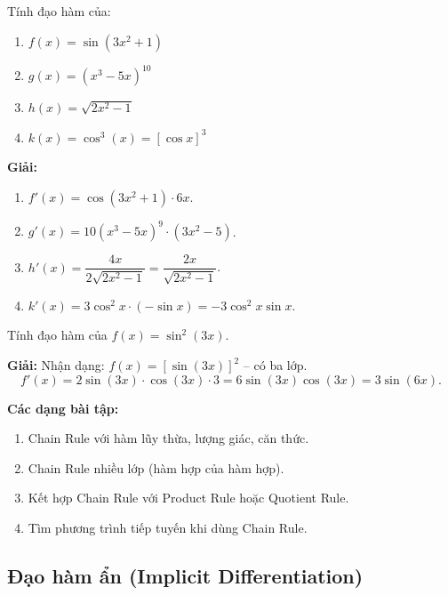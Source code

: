 \documentclass[12pt,a4paper]{article}
\begin{document}
\begin{vidu}
  Tính đạo hàm của:
  \begin{enumerate}[label=(\alph*)]
    \item $f(x) = \sin(3x^2 + 1)$
    \item $g(x) = (x^3 - 5x)^{10}$
    \item $h(x) = \sqrt{2x^2 - 1}$
    \item $k(x) = \cos^3(x) = [\cos x]^3$
  \end{enumerate}

  \medskip\textbf{Giải:}
  \begin{enumerate}[label=(\alph*)]
    \item $f'(x) = \cos(3x^2 + 1) \cdot 6x$.
    \item $g'(x) = 10(x^3 - 5x)^9 \cdot (3x^2 - 5)$.
    \item $h'(x) = \dfrac{4x}{2\sqrt{2x^2 - 1}} = \dfrac{2x}{\sqrt{2x^2 - 1}}$.
    \item $k'(x) = 3\cos^2 x \cdot (-\sin x) = -3\cos^2 x \sin x$.
  \end{enumerate}
\end{vidu}

\begin{vidu}[title={Chain Rule nhiều lớp}]
  Tính đạo hàm của $f(x) = \sin^2(3x)$.

  \medskip\textbf{Giải:}
  Nhận dạng: $f(x) = [\sin(3x)]^2$ -- có ba lớp.
  \[
    f'(x) = 2\sin(3x) \cdot \cos(3x) \cdot 3 = 6\sin(3x)\cos(3x) = 3\sin(6x).
  \]
\end{vidu}

\medskip\noindent\textbf{Các dạng bài tập:}
\begin{enumerate}[label=\textbf{Dạng \arabic*:}, leftmargin=*, align=left]
  \item Chain Rule với hàm lũy thừa, lượng giác, căn thức.
  \item Chain Rule nhiều lớp (hàm hợp của hàm hợp).
  \item Kết hợp Chain Rule với Product Rule hoặc Quotient Rule.
  \item Tìm phương trình tiếp tuyến khi dùng Chain Rule.
\end{enumerate}

\subsection{Đạo hàm ẩn (Implicit Differentiation)}
\end{document}
